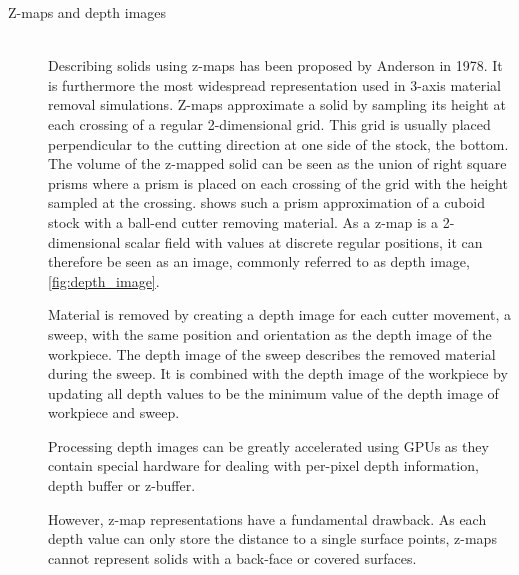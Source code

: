 \begin{description}
	\item[Z-maps and depth images] \hfill \\
	Describing solids using z-maps has been proposed by Anderson \cite{zmap} in 1978.
	It is furthermore the most widespread representation used in 3-axis material removal simulations.
	Z-maps approximate a solid by sampling its height at each crossing of a regular 2-dimensional grid.
	This grid is usually placed perpendicular to the cutting direction at one side of the stock, \eg the bottom.
	The volume of the z-mapped solid can be seen as the union of right square prisms where a prism is placed on each crossing of the grid with the height sampled at the crossing.
	 shows such a prism approximation of a cuboid stock with a ball-end cutter removing material.
	As a z-map is a 2-dimensional scalar field with values at discrete regular positions, it can therefore be seen as an image, commonly referred to as depth image, \cf \cref{fig:depth_image}.

	Material is removed by creating a depth image for each cutter movement, \ie a sweep, with the same position and orientation as the depth image of the workpiece.
	The depth image of the sweep describes the removed material during the sweep.
	It is combined with the depth image of the workpiece by updating all depth values to be the minimum value of the depth image of workpiece and sweep.

	Processing depth images can be greatly accelerated using GPUs as they contain special hardware for dealing with per-pixel depth information, \ie depth buffer or z-buffer.

	However, z-map representations have a fundamental drawback.
	As each depth value can only store the distance to a single surface points, z-maps cannot represent solids with a back-face or covered surfaces.


\end{description}

